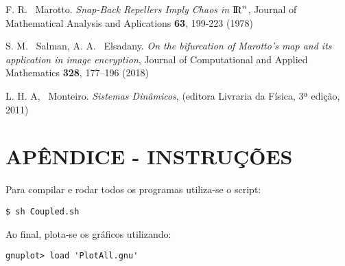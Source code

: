 \documentclass[brazilian, 12pt, a4paper, final]{article}
\begin{document}
\begin{multicols*}{2}
\begin{thebibliography}{n}
  F. R. ~Marotto. {\em Snap-Back Repellers Imply Chaos in ${\rm I\!R}^{n}$}, Journal of Mathematical Analysis and Aplications {\bf 63}, 199-223 (1978)
 
 S. M. ~Salman, A. A. ~Elsadany. {\em On the bifurcation of Marotto’s map and its application in image encryption}, Journal of Computational and Applied Mathematics {\bf 328}, 177–196 (2018)

 L. H. A, ~Monteiro. {\em Sistemas Dinâmicos}, (editora Livraria da Física, 3ª edição, 2011)
  
\end{thebibliography}
\end{multicols*}

\appendix
\section{APÊNDICE - INSTRUÇÕES}

Para compilar e rodar todos os programas utiliza-se o script:
\begin{verbatim}
$ sh Coupled.sh
\end{verbatim}

Ao final, plota-se os gráficos utilizando:
\begin{verbatim}
gnuplot> load 'PlotAll.gnu'
\end{verbatim}
\end{document}
